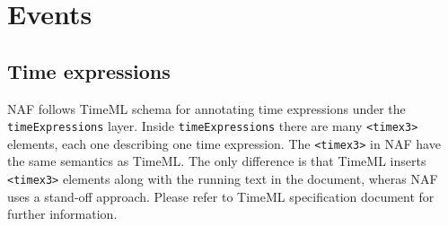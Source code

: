 
\section{Events}
\label{sec:events}


\subsection{Time expressions}
\label{sec:time-expressions}

NAF follows TimeML schema for annotating time expressions under the
\texttt{timeExpressions} layer. Inside \texttt{timeExpressions} there are
many \texttt{<timex3>} elements, each one describing one time
expression. The \texttt{<timex3>} in NAF have the same semantics as
TimeML. The only difference is that TimeML inserts \texttt{<timex3>}
elements along with the running text in the document, wheras NAF uses a
stand-off approach. Please refer to TimeML specification document
\cite{isotimeml} for further information.

